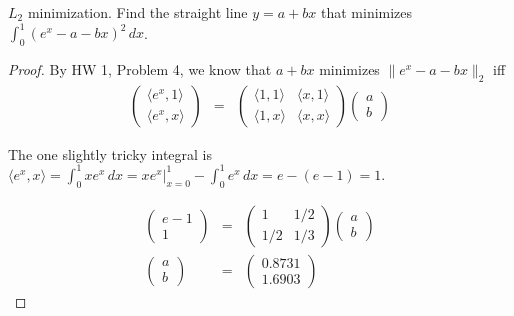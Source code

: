 \documentclass{article}
\begin{document}
 $L_2$ minimization. Find the straight line $y = a + bx$ that minimizes $\int_0^1(e^x − a − bx)^2 \, dx$.
\begin{proof}
By HW 1, Problem 4, we know that $a + bx$ minimizes $\|e^x - a - bx\|_2$ iff 
\begin{align*}
\left( \begin{array}{c}
\langle e^x, 1 \rangle \\
\langle e^x, x \rangle  \end{array}\right)
& = &
\left( \begin{array}{cc}
\langle 1, 1 \rangle & \langle x , 1 \rangle \\
\langle 1, x \rangle & \langle x , x \rangle \end{array} \right) 
\left( \begin{array}{c}
a \\
b \end{array}\right) 
\end{align*}

The one slightly tricky integral is $\langle e^x , x \rangle = \int_0^1 x e^x \, dx = x e^x \rvert_{x=0}^1 - \int_0^1 e^x \, dx = e - (e - 1) = 1$.

\begin{align*}
\left( \begin{array}{c}
 e - 1  \\
 1  \end{array}\right) & = & \left( \begin{array}{cc}
                                     1 &  1/2  \\
                                     1/2 & 1/3 \end{array} \right) 
                                                                  \left( \begin{array}{c}
                                                                      a \\
                                                                      b \end{array}\right) 
\\ \left( \begin{array}{c}
 a  \\
 b  \end{array}\right) & = & \left( \begin{array}{c}
                              0.8731 \\
                              1.6903 \end{array}\right)       
\end{align*} 

\end{proof}
\end{document}
